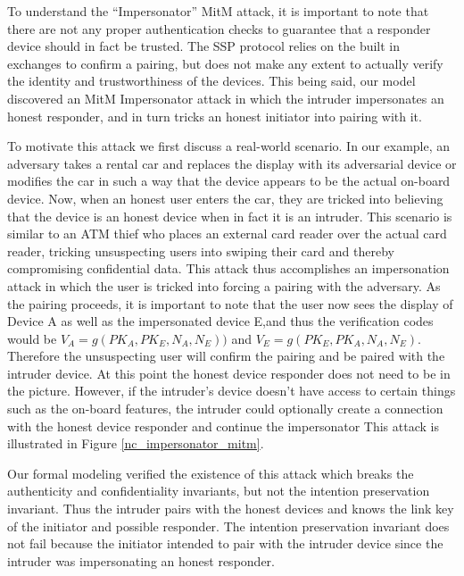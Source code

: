 \documentclass{acm_proc_article-sp}
\begin{document}
To understand the ``Impersonator'' MitM attack, it is important to note that there are not any proper authentication checks to guarantee that a responder device should in fact be trusted. The SSP protocol relies on the built in exchanges to confirm a pairing, but does not make any extent to actually verify the identity and trustworthiness of the devices. This being said, our model discovered an MitM Impersonator attack in which the intruder impersonates an honest responder, and in turn tricks an honest initiator into pairing with it.

To motivate this attack we first discuss a real-world scenario. In our example, an adversary takes a rental car and replaces the display with its adversarial device or modifies the car in such a way that the device appears to be the actual on-board device. Now, when an honest user enters the car, they are tricked into believing that the device is an honest device when in fact it is an intruder. This scenario is similar to an ATM thief who places an external card reader over the actual card reader, tricking unsuspecting users into swiping their card and thereby compromising confidential data. This attack thus accomplishes an impersonation attack in which the user is tricked into forcing a pairing with the adversary.  As the pairing proceeds, it is important to note that the user now sees the display of Device A as well as the impersonated device E,and thus the verification codes would be $V_A = g(PK_A, PK_E, N_A, N_E))$ and $V_E = g(PK_E, PK_A, N_A, N_E)$. Therefore the  unsuspecting user will confirm the pairing and be paired with the intruder device. At this point the honest device responder does not need to be in the picture. However, if the intruder's device doesn't have access to certain things such as the on-board features,  the intruder could optionally create a connection with the honest device responder and  continue the impersonator This attack is illustrated in Figure \ref{nc_impersonator_mitm}.

Our formal modeling verified the existence of this attack which breaks the authenticity and confidentiality invariants, but not the intention preservation invariant. Thus the intruder pairs with the honest devices and knows the link key of the initiator and possible responder. The intention preservation invariant does not fail because the initiator intended to pair with the intruder device since the intruder was impersonating an honest responder.
\end{document}

